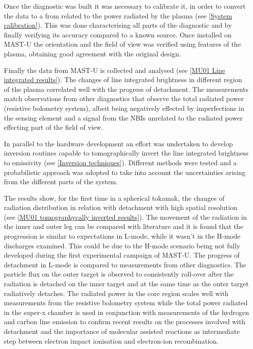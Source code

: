 Once the diagnostic was built it was necessary to calibrate it, in order to convert the data to a from related to the power radiated by the plasma (see \autoref{System calibration}). This was done characterising all parts of the diagnostic and by finally verifying its accuracy compared to a known source. Once installed on MAST-U the orientation and the field of view was verified using features of the plasma, obtaining good agreement with the original design.

Finally the data from MAST-U is collected and analysed (see \autoref{MU01 Line integrated results}). The changes of line integrated brightness in different region of the plasma correlated well with the progress of detachment. The measurements match observations from other diagnostics that observe the total radiated power (resistive bolometry system), albeit being negatively effected by imperfections in the sensing element and a signal from the NBIs unrelated to the radiated power effecting part of the field of view.

In parallel to the hardware development an effort was undertaken to develop inversion routines capable to tomographically invert the line integrated brightness to emissivity (see \autoref{Inversion techniques}). Different methods were tested and a probabilistic approach was adopted to take into account the uncertainties arising from the different parts of the system.

The results show, for the first time in a spherical tokamak, the changes of radiation distribution in relation with detachment with high spatial resolution (see \autoref{MU01 tomographycally inverted results}). The movement of the radiation in the inner and outer leg can be compared with literature\cite{Reimold2015,Potzel2014,Lipschultz1984,Bernert2021} and it is found that the progression is similar to expectations in L-mode, while it wasn't in the H-mode discharges examined. This could be due to the H-mode scenario being not fully developed during the first experimental campaign of MAST-U. The progress of detachment in L-mode is compared to measurements from other diagnostics. The particle flux on the outer target is observed to consistently roll-over after the radiation is detached on the inner target and at the same time as the outer target radiatively detaches.
The radiated power in the core region scales well with measurements from the resistive bolometry system while the total power radiated in the super-x chamber is used in conjunction with measurements of the hydrogen and carbon line emission to confirm recent results on the processes involved with detachment\cite{Verhaegh2022} and the importance of molecular assisted reactions as intermediate step between electron impact ionisation and electron-ion recombination.

